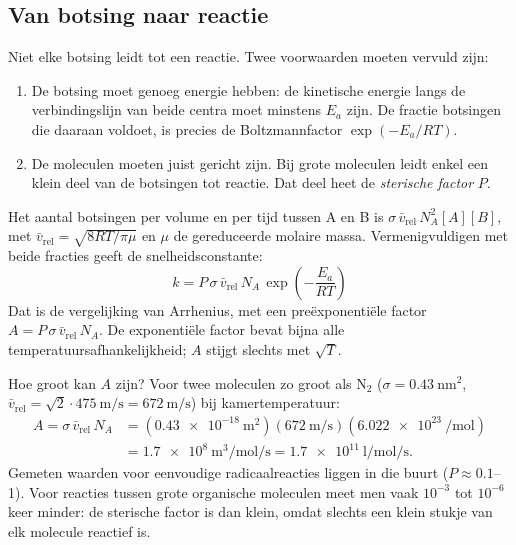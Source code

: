 \subsection{Van botsing naar reactie}

Niet elke botsing leidt tot een reactie. Twee voorwaarden moeten vervuld zijn:
\begin{enumerate}
\item De botsing moet genoeg energie hebben: de kinetische energie langs de verbindingslijn van beide centra moet minstens $E_a$ zijn. De fractie botsingen die daaraan voldoet, is precies de Boltzmannfactor $\exp(-E_a/RT)$.
\item De moleculen moeten juist gericht zijn. Bij grote moleculen leidt enkel een klein deel van de botsingen tot reactie. Dat deel heet de \emph{sterische factor} $P$.
\end{enumerate}
Het aantal botsingen per volume en per tijd tussen A en B is $\sigma\,\bar v_\mathrm{rel}\,N_A^2[A][B]$, met $\bar v_\mathrm{rel} = \sqrt{8RT/\pi\mu}$ en $\mu$ de gereduceerde molaire massa. Vermenigvuldigen met beide fracties geeft de snelheidsconstante:
\begin{equation}
\boxed{\;k = P\,\sigma\,\bar v_\mathrm{rel}\,N_A\,\exp\!\left(-\frac{E_a}{RT}\right)\;}
\label{eq:botsingstheorie}
\end{equation}
Dat is de vergelijking van Arrhenius, met een pre\"exponenti\"ele factor $A = P\,\sigma\,\bar v_\mathrm{rel}\,N_A$. De exponenti\"ele factor bevat bijna alle temperatuursafhankelijkheid; $A$ stijgt slechts met $\sqrt T$.

\begin{voorbeeld}{Hoe groot kan $A$ zijn?}
Voor twee moleculen zo groot als N$_2$ ($\sigma = \SI{0.43}{\nano\metre\squared}$, $\bar v_\mathrm{rel} = \sqrt2\cdot\SI{475}{\metre\per\second} = \SI{672}{\metre\per\second}$) bij kamertemperatuur:
\begin{align*}
A = \sigma\,\bar v_\mathrm{rel}\,N_A &= (\SI{0.43e-18}{\metre\squared})(\SI{672}{\metre\per\second})(\SI{6.022e23}{\per\mole})\\
&= \SI{1.7e8}{\metre\cubed\per\mole\per\second} = \SI{1.7e11}{\litre\per\mole\per\second}.
\end{align*}
Gemeten waarden voor eenvoudige radicaalreacties liggen in die buurt ($P \approx 0.1$--1). Voor reacties tussen grote organische moleculen meet men vaak $10^{-3}$ tot $10^{-6}$ keer minder: de sterische factor is dan klein, omdat slechts een klein stukje van elk molecule reactief is.
\end{voorbeeld}

